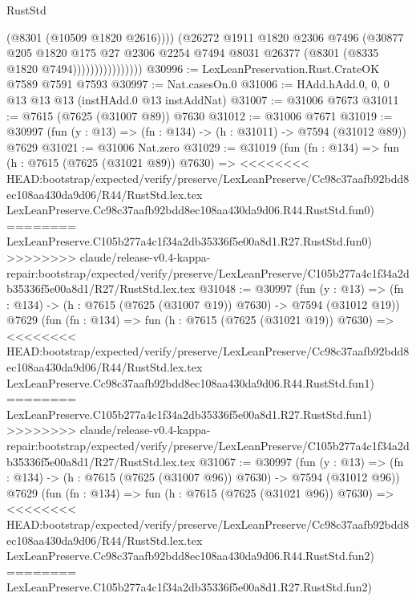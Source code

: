 \begin{lexlean}{RustStd}
\begin{coremodule}
{\begin{coremodule}
{{{{{{{{{{{{{{{{{{{{{{{{{{{{{{{{{{                                (@8301 (@10509 @1820 @2616))))
                            (@26272
                              @1911
                              @1820
                              @2306
                              @7496
                              (@30877
                                @205
                                @1820
                                @175
                                @27
                                @2306
                                @2254
                                @7494
                                @8031
                                @26377
                                (@8301 (@8335 @1820 @7494))))))))))))))))
@30996 := LexLeanPreservation.Rust.CrateOK @7589 @7591 @7593
@30997 := Nat.casesOn.{0}
@31006 := HAdd.hAdd.{0, 0, 0} @13 @13 @13 (instHAdd.{0} @13 instAddNat)
@31007 := @31006 @7673
@31011 := @7615 (@7625 (@31007 @89)) @7630
@31012 := @31006 @7671
@31019 := @30997 (fun (y : @13) => (fn : @134) -> (h : @31011) -> @7594 (@31012 @89)) @7629
@31021 := @31006 Nat.zero
@31029 := @31019
    (fun (fn : @134) =>
    fun (h : @7615 (@7625 (@31021 @89)) @7630) =>
<<<<<<<< HEAD:bootstrap/expected/verify/preserve/LexLeanPreserve/Cc98c37aafb92bdd8ec108aa430da9d06/R44/RustStd.lex.tex
    LexLeanPreserve.Cc98c37aafb92bdd8ec108aa430da9d06.R44.RustStd.fun0)
========
    LexLeanPreserve.C105b277a4c1f34a2db35336f5e00a8d1.R27.RustStd.fun0)
>>>>>>>> claude/release-v0.4-kappa-repair:bootstrap/expected/verify/preserve/LexLeanPreserve/C105b277a4c1f34a2db35336f5e00a8d1/R27/RustStd.lex.tex
@31048 := @30997
    (fun (y : @13) => (fn : @134) -> (h : @7615 (@7625 (@31007 @19)) @7630) -> @7594 (@31012 @19))
    @7629
    (fun (fn : @134) =>
    fun (h : @7615 (@7625 (@31021 @19)) @7630) =>
<<<<<<<< HEAD:bootstrap/expected/verify/preserve/LexLeanPreserve/Cc98c37aafb92bdd8ec108aa430da9d06/R44/RustStd.lex.tex
    LexLeanPreserve.Cc98c37aafb92bdd8ec108aa430da9d06.R44.RustStd.fun1)
========
    LexLeanPreserve.C105b277a4c1f34a2db35336f5e00a8d1.R27.RustStd.fun1)
>>>>>>>> claude/release-v0.4-kappa-repair:bootstrap/expected/verify/preserve/LexLeanPreserve/C105b277a4c1f34a2db35336f5e00a8d1/R27/RustStd.lex.tex
@31067 := @30997
    (fun (y : @13) => (fn : @134) -> (h : @7615 (@7625 (@31007 @96)) @7630) -> @7594 (@31012 @96))
    @7629
    (fun (fn : @134) =>
    fun (h : @7615 (@7625 (@31021 @96)) @7630) =>
<<<<<<<< HEAD:bootstrap/expected/verify/preserve/LexLeanPreserve/Cc98c37aafb92bdd8ec108aa430da9d06/R44/RustStd.lex.tex
    LexLeanPreserve.Cc98c37aafb92bdd8ec108aa430da9d06.R44.RustStd.fun2)
========
    LexLeanPreserve.C105b277a4c1f34a2db35336f5e00a8d1.R27.RustStd.fun2)
}}}}}}}}}}}}}}}}}}}}}}}}}}}}}}}}}}
\end{coremodule}}
\end{coremodule}
\end{lexlean}
